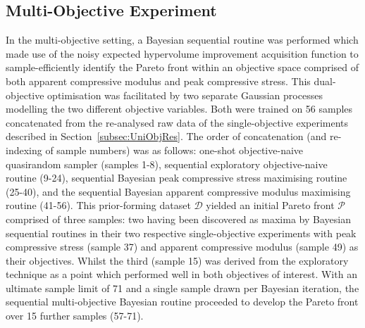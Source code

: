 \subsection{Multi-Objective Experiment}
\label{subsec:MultiObjRes}
In the multi-objective setting, a Bayesian sequential routine was performed
 which made use of the noisy expected hypervolume improvement acquisition
 function to sample-efficiently identify the Pareto front within an objective
 space comprised of both apparent compressive modulus and peak compressive
 stress.
This dual-objective optimisation was facilitated by two separate Gaussian
 processes modelling the two different objective variables.
Both were trained on 56 samples concatenated from the re-analysed raw data 
 of the single-objective experiments described in Section~\ref{subsec:UniObjRes}.
The order of concatenation (and re-indexing of sample numbers) was as
 follows: one-shot objective-naive quasirandom sampler (samples 1-8),
 sequential exploratory objective-naive routine (9-24), sequential Bayesian
 peak compressive stress maximising routine (25-40), and the sequential Bayesian
 apparent compressive modulus maximising routine (41-56).
This prior-forming dataset \(\mathcal{D}\) yielded an initial Pareto front
 \(\mathcal{P}\) comprised of three samples: two having been discovered
 as maxima by Bayesian sequential routines in their two respective
 single-objective experiments with peak compressive stress (sample 37) and
 apparent compressive modulus (sample 49) as their objectives.
Whilst the third (sample 15) was derived from the exploratory technique as a
 point which performed well in both objectives of interest.
With an ultimate sample limit of 71 and a single sample drawn per Bayesian
 iteration, the sequential multi-objective Bayesian routine proceeded to
 develop the Pareto front over 15 further samples (57-71).

